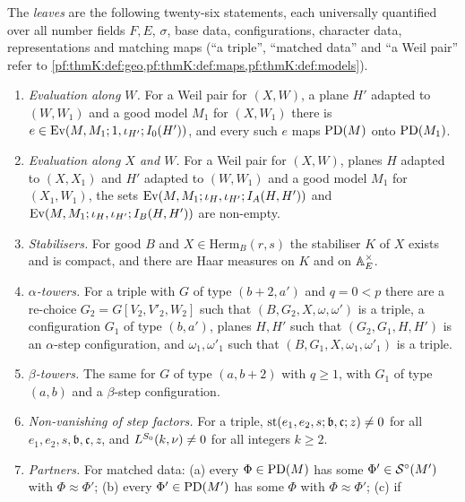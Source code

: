 \begin{definition}\label{def:pf:thmK:leaves}
The \emph{leaves} are the following twenty-six statements, each universally quantified over all number fields $F,E$,
$\sigma$, base data, configurations, character data, representations and matching maps (``a triple'', ``matched data''
and ``a Weil pair'' refer to \cref{pf:thmK:def:geo,pf:thmK:def:maps,pf:thmK:def:models}).
\begin{enumerate}[label=(L\arabic*),leftmargin=*]
\item\label{pf:thmK:L:evzero} \emph{Evaluation along $W$.} For a Weil pair for $(X,W)$, a plane $H'$ adapted to $(W,W_1)$
and a good model $M_1$ for $(X,W_1)$ there is $e\in\operatorname{Ev}(M,M_1;1,\iota_{H'};I_0(H'))$, and every such $e$ maps
$\operatorname{PD}(M)$ onto $\operatorname{PD}(M_1)$.
\item\label{pf:thmK:L:evcone} \emph{Evaluation along $X$ and $W$.} For a Weil pair for $(X,W)$, planes $H$ adapted to
$(X,X_1)$ and $H'$ adapted to $(W,W_1)$ and a good model $M_1$ for $(X_1,W_1)$, the sets
$\operatorname{Ev}(M,M_1;\iota_H,\iota_{H'};I_A(H,H'))$ and $\operatorname{Ev}(M,M_1;\iota_H,\iota_{H'};I_B(H,H'))$ are non-empty.
\item\label{pf:thmK:L:stab} \emph{Stabilisers.} For good $B$ and $X\in\mathrm{Herm}_B(r,s)$ the stabiliser $K$ of $X$
exists and is compact, and there are Haar measures on $K$ and on $\mathbb{A}_E^\times$.
\item\label{pf:thmK:L:towerA} \emph{$\alpha$-towers.} For a triple with $G$ of type $(b+2,a')$ and $q=0<p$ there are a
re-choice $G_2=G[V_2,V'_2,W_2]$ such that $(B,G_2,X,\omega,\omega')$ is a triple, a configuration $G_1$ of type $(b,a')$,
planes $H,H'$ such that $(G_2,G_1,H,H')$ is an $\alpha$-step configuration, and $\omega_1,\omega'_1$ such that
$(B,G_1,X,\omega_1,\omega'_1)$ is a triple.
\item\label{pf:thmK:L:towerB} \emph{$\beta$-towers.} The same for $G$ of type $(a,b+2)$ with $q\ge1$, with $G_1$ of type
$(a,b)$ and a $\beta$-step configuration.
\item\label{pf:thmK:L:facne} \emph{Non-vanishing of step factors.} For a triple,
$\operatorname{st}(e_1,e_2,s;\mathfrak b,\mathfrak c;z)\ne0$ for all $e_1,e_2,s,\mathfrak b,\mathfrak c,z$, and
$L^{S_0}(k,\nu)\ne0$ for all integers $k\ge2$.
\item\label{pf:thmK:L:matchex} \emph{Partners.} For matched data: (a) every $\Phi\in\operatorname{PD}(M)$ has some
$\Phi'\in\mathcal{S}^{\circ}(M')$ with $\Phi\approx\Phi'$; (b) every $\Phi'\in\operatorname{PD}(M')$ has some $\Phi$ with $\Phi\approx\Phi'$; (c) if

\end{enumerate}
\end{definition}
